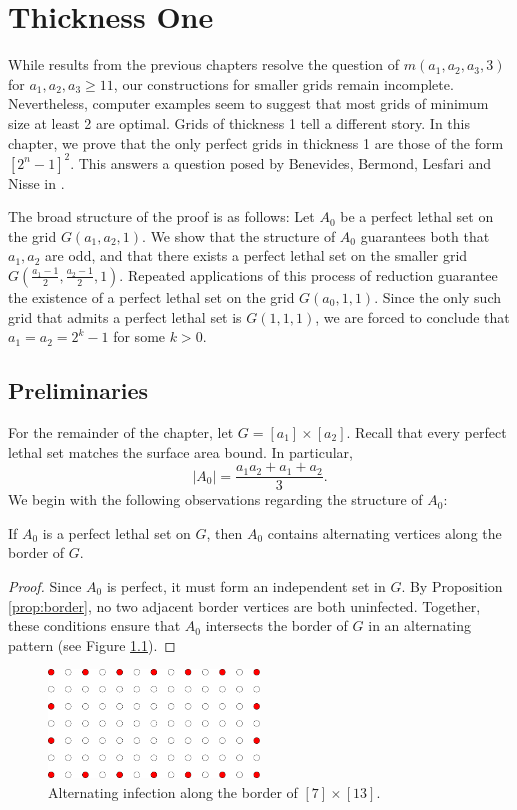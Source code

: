 \chapter{Thickness One}

While results from the previous chapters resolve the question of $m(a_1,a_2,a_3,3)$ for $a_1, a_2 , a_3 \geq 11$, our constructions for smaller grids remain incomplete. Nevertheless, computer examples seem to suggest that most grids of minimum size at least 2 are optimal. Grids of thickness 1 tell a different story. In this chapter, we prove that the only perfect grids in thickness 1 are those of the form $[2^n-1]^2$. This answers a question posed by Benevides, Bermond, Lesfari and Nisse in \cite{benevides:2021}.

The broad structure of the proof is as follows: Let $A_0$ be a perfect lethal set on the grid $G(a_1, a_2, 1)$. We show that the structure of $A_0$ guarantees both that $a_1,a_2$ are odd, and that there exists a perfect lethal set on the smaller grid $G(\frac{a_1-1}{2}, \frac{a_2-1}{2}, 1)$. Repeated applications of this process of reduction guarantee the existence of a perfect lethal set on the grid $G(a_0, 1,1)$. Since the only such grid that admits a perfect lethal set is $G(1,1,1)$, we are forced to conclude that $a_1 = a_2 = 2^k-1$ for some $k > 0$. 

\section{Preliminaries}
For the remainder of the chapter, let $G = [a_1] \times [a_2]$. Recall that every perfect lethal set matches the surface area bound. In particular,
$$|A_0| = \frac{a_1a_2 + a_1 + a_2}{3}.$$
We begin with the following observations regarding the structure of $A_0$:

\begin{prop}
\label{prop:alternating_border}
If $A_0$ is a perfect lethal set on $G$, then $A_0$ contains alternating vertices along the border of $G$. 
\end{prop}

\begin{proof}
Since $A_0$ is perfect, it must form an independent set in $G$. By Proposition \ref{prop:border}, no two adjacent border vertices are both uninfected. Together, these conditions ensure that $A_0$ intersects the border of $G$ in an alternating pattern (see Figure \ref{fig:border}). 
\end{proof}

\begin{figure}[]
\centering
\includegraphics[width=0.5\textwidth]{figures/6/border.pdf}
\caption{Alternating infection along the border of $[7] \times [13]$.}
\label{fig:border}
\end{figure} 

